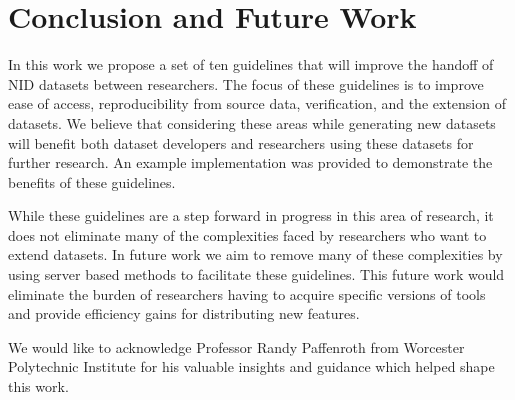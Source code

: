 \documentclass[sigconf, anonymous, screen, review]{acmart}
\begin{document}
\section{Conclusion and Future Work}\label{sec:conclusion}
In this work we propose a set of ten guidelines that will improve the handoff of NID datasets between researchers.
The focus of these guidelines is to improve ease of access, reproducibility from source data, verification, and the extension of datasets.
We believe that considering these areas while generating new datasets will benefit both dataset developers and researchers using these datasets for further research.
An example implementation was provided to demonstrate the benefits of these guidelines.

While these guidelines are a step forward in progress in this area of research, it does not eliminate many of the complexities faced by researchers who want to extend datasets.
In future work we aim to remove many of these complexities by using server based methods to facilitate these guidelines.
This future work would eliminate the burden of researchers having to acquire specific versions of tools and provide efficiency gains for distributing new features.

\begin{acks}
    We would like to acknowledge Professor Randy Paffenroth from Worcester Polytechnic Institute for his valuable insights and guidance which helped shape this work.
\end{acks}




\appendix
\end{document}
